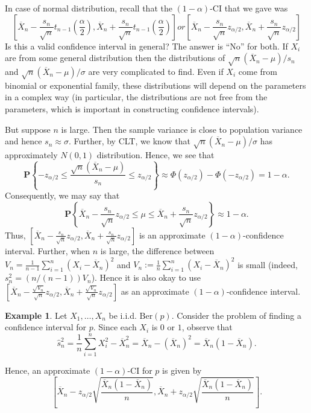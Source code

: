 \documentclass[preprint,  11pt]{amsart}
\theoremstyle{plain} %
\theoremstyle{definition} %
\newtheorem{example}[theorem]{Example}
\begin{document}
In case of normal distribution, recall that the $(1-\alpha)$-CI that we gave was
$$
\left[\overline{X}_{n}-\frac{s_{n}}{\sqrt{n}}t_{n-1}\left(\frac{\alpha}{2}\right),\overline{X}_{n}+\frac{s_{n}}{\sqrt{n}}t_{n-1}\left(\frac{\alpha}{2}\right)\right] or \left[\overline{X}_{n}-\frac{s_{n}}{\sqrt{n}}z_{\alpha/2},\overline{X}_{n}+\frac{s_{n}}{\sqrt{n}}z_{\alpha/2}\right]
$$
 Is this a valid confidence interval in general? The answer is ``No'' for both. If $X_{i}$ are from some general distribution then the distributions of $\sqrt{n}(\overline{X}_{n}-\mu)/s_{n}$ and $\sqrt{n}(\overline{X}_{n}-\mu)/{\sigma}$ are very complicated to find. Even if $X_{i}$ come from binomial or exponential family, these distributions will depend on the parameters in a complex way (in particular, the distributions are not free from the parameters, which is important in constructing confidence intervals). 
 
 But suppose $n$ is large. Then the sample variance is close to population variance and hence $s_{n}\approx {\sigma}
$. Further, by CLT, we know that $\sqrt{n}(\overline{X}_{n}-\mu)/{\sigma}$ has approximately    $N(0,1)$ distribution. Hence, we see that
$$
\mathbf{P}\left\{-z_{\alpha/2}\le  \frac{\sqrt{n}(\overline{X}_{n}-\mu)}{s_{n}} \le z_{\alpha/2}\right\} \approx \Phi(z_{\alpha/2})-\Phi(-z_{\alpha/2}) =1-\alpha.
$$
Consequently, we may say that 
$$
\mathbf{P}\left\{ \overline{X}_{n}-\frac{s_{n}}{\sqrt{n}}z_{\alpha/2} \le \mu \le \overline{X}_{n}+\frac{s_{n}}{\sqrt{n}}z_{\alpha/2}\right\} \approx 1-\alpha.
$$
Thus, $\left[\overline{X}_{n}-\frac{s_{n}}{\sqrt{n}}z_{\alpha/2}, \overline{X}_{n}+\frac{s_{n}}{\sqrt{n}}z_{\alpha/2} \right]$ is an approximate $(1-\alpha)$-confidence interval. Further, when $n$ is large, the difference between $V_{n}=\frac{1}{n-1}\sum_{i=1}^{n}(X_{i}-\overline{X}_{n})^{2}$ and $V_{n}:=\frac{1}{n}\sum_{i=1}^{n}(X_{i}-\overline{X}_{n})^{2}$ is small (indeed, $s_{n}^{2}=(n/(n-1))V_{n}$). Hence it is also okay to use $\left[\overline{X}_{n}-\frac{\sqrt{V_{n}}}{\sqrt{n}}z_{\alpha/2}, \overline{X}_{n}+\frac{\sqrt{V_{n}}}{\sqrt{n}}z_{\alpha/2} \right]$ as an approximate $(1-\alpha)$-confidence interval.

\begin{example} Let $X_{1},\ldots ,X_{n}$ be i.i.d. $\mbox{Ber}(p)$. Consider the problem of finding a confidence interval for $p$. Since each $X_{i}$ is $0$ or $1$, observe that 
$$
\hat{s}_{n}^{2}= \frac{1}{n}\sum_{i=1}^{n}X_{i}^{2} - \overline{X}_{n}^{2} = \overline{X}_{n}-(\overline{X}_{n})^{2} = \overline{X}_{n}(1-\overline{X}_{n}).
$$
\end{example}
Hence, an approximate $(1-\alpha)$-CI for $p$ is given by 
$$
\left[\overline{X}_{n}-z_{\alpha/2}\sqrt{\frac{\overline{X}_{n}(1-\overline{X}_{n})}{n}}, \overline{X}_{n}+z_{\alpha/2}\sqrt{\frac{\overline{X}_{n}(1-\overline{X}_{n})}{n}}\right].
$$
\end{document}
